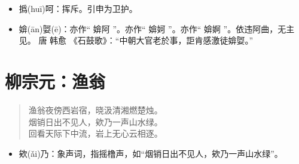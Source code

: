 \documentclass[12pt,oneside]{book}
\newenvironment{shici}{%
\begin{verse}\centering\yanti\large\hspace{12pt}}{\end{verse}}
\begin{document}
\begin{common-format}
\begin{itemize}
\item 撝(huī)呵：挥斥。引申为卫护。
\item 媕(ān)娿(ē)：亦作“ 媕阿 ”。亦作“ 媕妸 ”。亦作“ 媕婀 ”。依违阿曲，无主见。 唐 韩愈 《石鼓歌》：“中朝大官老於事，詎肯感激徒媕娿。”
\end{itemize}


\chapter{柳宗元：渔翁}
\begin{shici}
渔翁夜傍西岩宿，晓汲清湘燃楚烛。\\
烟销日出不见人，欸乃一声山水绿。\\
回看天际下中流，岩上无心云相逐。
\end{shici}

\begin{itemize}
\item 欸(ǎi)乃：象声词，指摇橹声，如“烟销日出不见人，欸乃一声山水绿”。
\end{itemize}


\end{common-format}
\end{document}
